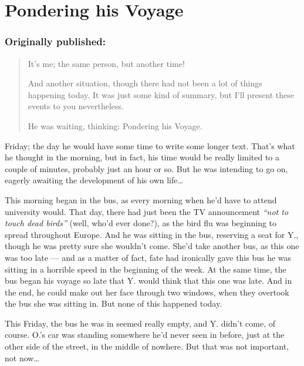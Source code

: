 \chapter{Pondering his Voyage}
\label{cha:pondering-his-voyage}
\subsection*{Originally published: }
\begin{quote}
It's me; the same person, but another time!

And another situation, though there had not been a lot of things happening today. It was just some kind of summary, but I'll present these events to you nevertheless.

He was waiting, thinking: Pondering his Voyage.
\end{quote}

Friday; the day he would have some time to write some longer text. 
That's what he thought in the morning, but in fact, his time would be really limited to a couple of minutes, probably just an hour or so. But he was intending to go on, eagerly awaiting the development of his own life\ldots

This morning began in the bus, as every morning when he'd have to attend university would. That day, there had just been the TV announcement \emph{\enquote{not to touch dead birds}} (well, who'd ever done?), as the bird flu was beginning to spread throughout Europe. 
And he was sitting in the bus, reserving a seat for Y., though he was pretty sure she wouldn't come. She'd take another bus, as this one was too late --- and as a matter of fact, fate had ironically gave this bus he was sitting in a horrible speed in the beginning of the week. At the same time, the bus began his voyage so late that Y. would think that this one was late. And in the end, he could make out her face through two windows, when they overtook the bus she was sitting in. 
But none of this happened today.

This Friday, the bus he was in seemed really empty, and Y. didn't come, of course. O.'s car was standing somewhere he'd never seen in before, just at the other side of the street, in the middle of nowhere. But that was not important, not now\ldots

